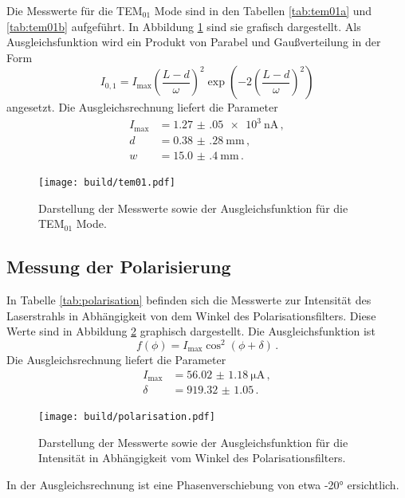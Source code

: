 Die Messwerte für die TEM$_{\mathrm{01}}$ Mode sind in den Tabellen \ref{tab:tem01a} und \ref{tab:tem01b} aufgeführt. In Abbildung \ref{fig:tem01} sind sie grafisch dargestellt. Als Ausgleichsfunktion wird ein Produkt von Parabel und Gaußverteilung in der Form
\begin{equation*}
  I_{0,1}=I_{\text{max}}\left(\frac{L-d}{\omega}\right)^2 \exp\left(-2\left(\frac{L-d}{\omega}\right)^2\right)
\end{equation*}
angesetzt.
Die Ausgleichsrechnung liefert die Parameter
\begin{align*}
  I_{\text{max}}&=\SI{1.27(05)e3}{\nano\ampere} \,,\\
  d&=\SI{0.38(28)}{\milli\metre} \,,\\
  w&=\SI{15.0(4)}{\milli\metre} \,.
\end{align*}

\begin{figure}
  \centering
  \texttt{[image: build/tem01.pdf]}
  \caption{Darstellung der Messwerte sowie der Ausgleichsfunktion für die TEM$_{\mathrm{01}}$ Mode.}
  \label{fig:tem01}
\end{figure}

\subsection{Messung der Polarisierung}
\label{subsec:polarisierung}

In Tabelle \ref{tab:polarisation} befinden sich die Messwerte zur Intensität des
Laserstrahls in Abhängigkeit von dem Winkel des Polarisationsfilters. Diese Werte
sind in Abbildung \ref{fig:polarisation} graphisch dargestellt. Die Ausgleichsfunktion ist
\begin{equation*}
  f(\phi)=I_{\text{max}} \cos^2(\phi+\delta)\,.
\end{equation*}
Die Ausgleichsrechnung liefert die Parameter
\begin{align*}
  I_{\text{max}}&=\SI{56.02(118)}{\micro\ampere} \,, \\
  \delta&=\SI{919.32(105)} \,.
\end{align*}

\begin{figure}
  \centering
  \texttt{[image: build/polarisation.pdf]}
  \caption{Darstellung der Messwerte sowie der Ausgleichsfunktion für die Intensität in
  Abhängigkeit vom Winkel des Polarisationsfilters.}
  \label{fig:polarisation}
\end{figure}

In der Ausgleichsrechnung ist eine Phasenverschiebung von etwa -20° ersichtlich.

